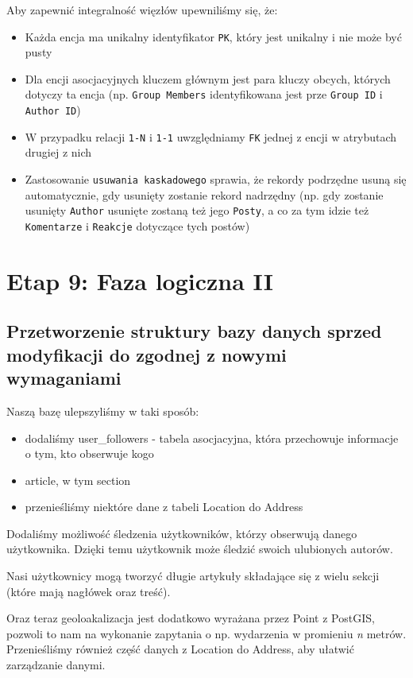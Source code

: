 \documentclass{article}
\begin{document}
Aby zapewnić integralność więzłów upewniliśmy się, że:
\begin{itemize}
    \item Każda encja ma unikalny identyfikator \texttt{PK}, który jest unikalny i nie może być pusty
    \item Dla encji asocjacyjnych kluczem głównym jest para kluczy obcych, których dotyczy ta encja (np. \texttt{Group Members} identyfikowana jest prze \texttt{Group ID} i \texttt{Author ID})
    \item W przypadku relacji \texttt{1-N}  i \texttt{1-1} uwzględniamy \texttt{FK} jednej z encji w atrybutach drugiej z nich
    \item Zastosowanie \texttt{usuwania kaskadowego} sprawia, że rekordy podrzędne usuną się automatycznie, gdy usunięty zostanie rekord nadrzędny (np. gdy zostanie usunięty \texttt{Author} usunięte zostaną też jego \texttt{Posty}, a co za tym idzie też \texttt{Komentarze} i \texttt{Reakcje} dotyczące tych postów)
\end{itemize}

\newpage 

\section{Etap 9: Faza logiczna II}

\subsection{Przetworzenie struktury bazy danych sprzed modyfikacji do zgodnej z nowymi wymaganiami}

Naszą bazę ulepszyliśmy w taki sposób:

\begin{itemize}
  \item dodaliśmy user\_followers - tabela asocjacyjna, która przechowuje informacje o tym, kto obserwuje kogo
  \item article, w tym section
  \item przenieśliśmy niektóre dane z tabeli Location do Address
\end{itemize}

Dodaliśmy możliwość śledzenia użytkowników, którzy obserwują danego użytkownika. Dzięki temu użytkownik może śledzić swoich ulubionych autorów.

Nasi użytkownicy mogą tworzyć długie artykuły składające się z wielu sekcji (które mają nagłówek oraz treść).

Oraz teraz geoloakalizacja jest dodatkowo wyrażana przez Point z PostGIS, pozwoli to nam na wykonanie zapytania o np. wydarzenia w promieniu \textit{n} metrów. Przenieśliśmy również część danych z Location do Address, aby ułatwić zarządzanie danymi.
\end{document}
